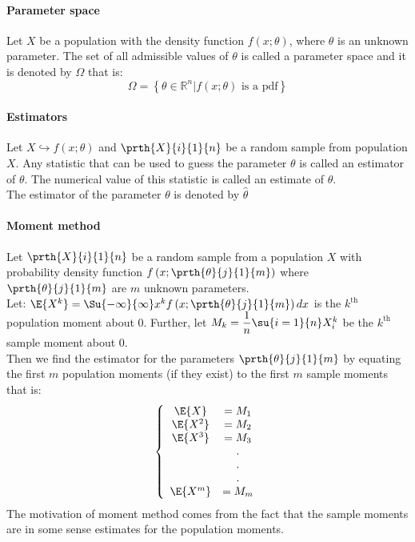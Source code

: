 \paragraph{Parameter space}
Let $X$ be a population with the density function $f(x;\theta)$, where
$\theta$ is an unknown parameter. The set of all admissible values of 
$\theta$ is called a parameter space and it is denoted by $\Omega$ that
is:
$$
\Omega = \left\{\theta\in\mathbb{R}^{n}|f(x;\theta)\text{ is a pdf}\right\}
$$

\paragraph{Estimators}
Let $X\hookrightarrow f(x;\theta)$ and $\prth{X}{i}{1}{n}$ be a random
sample from population $X$. Any statistic that can be used to guess
the parameter $\theta$ is called an estimator of $\theta$. The 
numerical value of this statistic is called an estimate of $\theta$.\\
The estimator of the parameter $\theta$ is denoted by $\hat{\theta}$

\paragraph{Moment method}
Let $\prth{X}{i}{1}{n}$ be a random sample from a population $X$ with
probability density function $f\left(x;\prth{\theta}{j}{1}{m}\right)$
where $\prth{\theta}{j}{1}{m}$ are $m$ unknown parameters.\\
Let:
$\E{X^{k}}=\Su{-\infty}{\infty}x^{k}f\left(x;\prth{\theta}{j}{1}{m}\right)dx$ is the $k^{\text{th}}$ population moment about 0. Further, let
$M_{k}=\dfrac{1}{n}\su{{i=1}}{n}X_{i}^{k}$ be the $k^{\text{th}}$ 
sample moment about 0.\\
Then we find the estimator for the parameters $\prth{\theta}{j}{1}{m}$
by equating the first $m$ population moments (if they exist) to the
first $m$ sample moments that is:
$$
\left\{
\begin{array}{cc}
	\E{X}&= M_{1}\\
	\E{X^{2}}&= M_{2}\\
	\E{X^{3}}&= M_{3}\\
	&.\\
	&.\\
	&.\\
	\E{X^{m}}&= M_{m}

\end{array}
\right.
$$
The motivation of moment method comes from the fact that the sample 
moments are in some sense estimates for the population moments.
